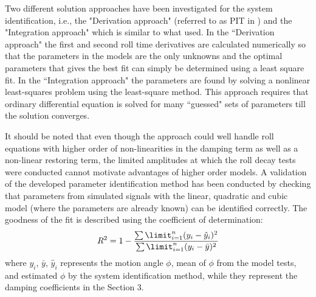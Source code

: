 Two different solution approaches have been investigated for the system identification, i.e., the "Derivation approach" (referred to as PIT in \parencite{imo_1200_2006}) and the "Integration approach" which is similar to what \parencite{soder_assessment_2019} used. In the ``Derivation approach" the first and second roll time derivatives are calculated numerically so that the parameters in the models are the only unknowns and the optimal parameters that gives the best fit can simply be determined using a least square fit.
In the ``Integration approach" the parameters are found by solving a nonlinear least-squares problem using the least-square method. This approach requires that ordinary differential equation is solved for many ``guessed" sets of parameters till the solution converges.

It should be noted that even though the approach could well handle roll equations with higher order of non-linearities in the damping term as well as a non-linear restoring term, the limited amplitudes at which the roll decay tests were conducted cannot motivate advantages of higher order models. A validation of the developed parameter identification method has been conducted by checking that parameters from simulated signals with the linear, quadratic and cubic model  (where the parameters are already known) can be identified correctly. 
The goodness of the fit is described using the coefficient of determination:
\begin{equation} \label{eq:R2}
R^2=1-\frac{\sum\limit_{i=1}^{n}(y_i-\hat{y}_i)^2}{\sum\limit_{i=1}^{n}(y_i-\bar{y})^2}
\end{equation}
where $y_i$, $\bar y$, $\hat{y}_i$ represents the motion angle $\phi$, mean of $\phi$ from the model tests, and estimated $\phi$ by the system identification method, while they represent the damping coefficients in the Section 3.      


